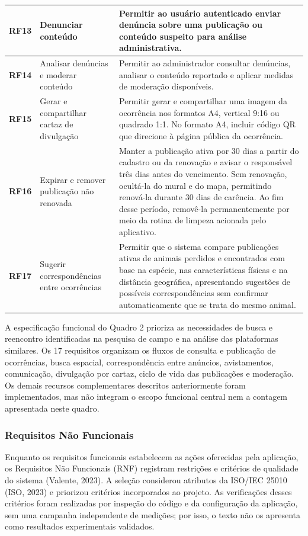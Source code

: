 {\begin{longtable}{|>{\centering\arraybackslash}p{1.3cm}|>{\raggedright\arraybackslash}p{4.2cm}|>{\raggedright\arraybackslash}p{8.8cm}|}
\textbf{RF13} & Denunciar conteúdo & Permitir ao usuário autenticado enviar denúncia sobre uma publicação ou conteúdo suspeito para análise administrativa. \\ \hline
\textbf{RF14} & Analisar denúncias e moderar conteúdo & Permitir ao administrador consultar denúncias, analisar o conteúdo reportado e aplicar medidas de moderação disponíveis. \\ \hline
\textbf{RF15} & Gerar e compartilhar cartaz de divulgação & Permitir gerar e compartilhar uma imagem da ocorrência nos formatos A4, vertical 9:16 ou quadrado 1:1. No formato A4, incluir código QR que direcione à página pública da ocorrência. \\ \hline
\textbf{RF16} & Expirar e remover publicação não renovada & Manter a publicação ativa por 30 dias a partir do cadastro ou da renovação e avisar o responsável três dias antes do vencimento. Sem renovação, ocultá-la do mural e do mapa, permitindo renová-la durante 30 dias de carência. Ao fim desse período, removê-la permanentemente por meio da rotina de limpeza acionada pelo aplicativo. \\ \hline
\textbf{RF17} & Sugerir correspondências entre ocorrências & Permitir que o sistema compare publicações ativas de animais perdidos e encontrados com base na espécie, nas características físicas e na distância geográfica, apresentando sugestões de possíveis correspondências sem confirmar automaticamente que se trata do mesmo animal. \\ \hline
\end{longtable}
}

A especificação funcional do Quadro 2 prioriza as necessidades de busca e reencontro identificadas na pesquisa de campo e na análise das plataformas similares. Os 17 requisitos organizam os fluxos de consulta e publicação de ocorrências, busca espacial, correspondência entre anúncios, avistamentos, comunicação, divulgação por cartaz, ciclo de vida das publicações e moderação. Os demais recursos complementares descritos anteriormente foram implementados, mas não integram o escopo funcional central nem a contagem apresentada neste quadro.


\subsubsection{Requisitos Não Funcionais}

Enquanto os requisitos funcionais estabelecem as ações oferecidas pela aplicação, os Requisitos Não Funcionais (RNF) registram restrições e critérios de qualidade do sistema (Valente, 2023). A seleção considerou atributos da ISO/IEC 25010 (ISO, 2023) e priorizou critérios incorporados ao projeto. As verificações desses critérios foram realizadas por inspeção do código e da configuração da aplicação, sem uma campanha independente de medições; por isso, o texto não os apresenta como resultados experimentais validados.

